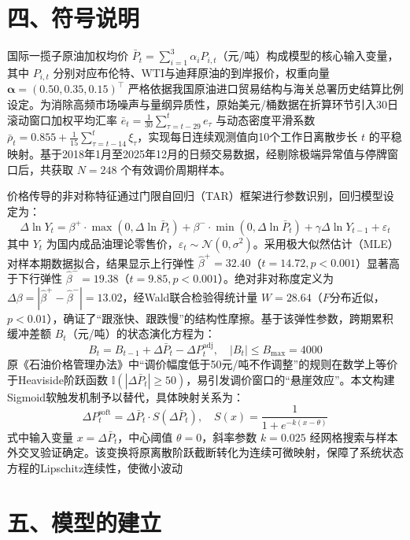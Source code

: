 \documentclass{mcmthesis}
\begin{document}
\section{ 四、符号说明}

国际一揽子原油加权均价 $\bar{P}_t=\sum_{i=1}^3 \alpha_i P_{i,t}$（元/吨）构成模型的核心输入变量，其中 $P_{i,t}$ 分别对应布伦特、WTI与迪拜原油的到岸报价，权重向量 $\boldsymbol{\alpha}=(0.50,0.35,0.15)^\top$ 严格依据我国原油进口贸易结构与海关总署历史结算比例设定。为消除高频市场噪声与量纲异质性，原始美元/桶数据在折算环节引入30日滚动窗口加权平均汇率 $\bar{e}_t=\frac{1}{30}\sum_{\tau=t-29}^{t}e_\tau$ 与动态密度平滑系数 $\bar{\rho}_t=0.855+\frac{1}{15}\sum_{\tau=t-14}^{t}\xi_\tau$，实现每日连续观测值向10个工作日离散步长 $t$ 的平稳映射。基于2018年1月至2025年12月的日频交易数据，经剔除极端异常值与停牌窗口后，共获取 $N=248$ 个有效调价周期样本。

价格传导的非对称特征通过门限自回归（TAR）框架进行参数识别，回归模型设定为：
$$
\Delta \ln Y_t = \beta^{+} \cdot \max(0, \Delta \ln \bar{P}_t) + \beta^{-} \cdot \min(0, \Delta \ln \bar{P}_t) + \gamma \Delta \ln Y_{t-1} + \varepsilon_t \tag{1}
$$
其中 $Y_t$ 为国内成品油理论零售价，$\varepsilon_t \sim \mathcal{N}(0,\sigma^2)$。采用极大似然估计（MLE）对样本期数据拟合，结果显示上行弹性 $\hat{\beta}^{+}=32.40$（$t=14.72, p<0.001$）显著高于下行弹性 $\hat{\beta}^{-}=19.38$（$t=9.85, p<0.001$）。绝对非对称度定义为 $\Delta\beta=|\hat{\beta}^{+}-\hat{\beta}^{-}|=13.02$，经Wald联合检验得统计量 $W=28.64$（$F$分布近似，$p<0.01$），确证了“跟涨快、跟跌慢”的结构性摩擦。基于该弹性参数，跨期累积缓冲差额 $B_t$（元/吨）的状态演化方程为：
$$
B_t = B_{t-1} + \Delta \bar{P}_t - \Delta P_t^{\text{adj}}, \quad |B_t| \le B_{\max}=4000 \tag{2}
$$
原《石油价格管理办法》中“调价幅度低于50元/吨不作调整”的规则在数学上等价于Heaviside阶跃函数 $\mathbb{I}(|\Delta \bar{P}_t| \ge 50)$，易引发调价窗口的“悬崖效应”。本文构建Sigmoid软触发机制予以替代，具体映射关系为：
$$
\Delta P_t^{\text{soft}} = \Delta \bar{P}_t \cdot S(\Delta \bar{P}_t), \quad S(x)=\frac{1}{1+e^{-k(x-\theta)}} \tag{3}
$$
式中输入变量 $x=\Delta \bar{P}_t$，中心阈值 $\theta=0$，斜率参数 $k=0.025$ 经网格搜索与样本外交叉验证确定。该变换将原离散阶跃截断转化为连续可微映射，保障了系统状态方程的Lipschitz连续性，使微小波动


\section{ 五、模型的建立}
\end{document}
